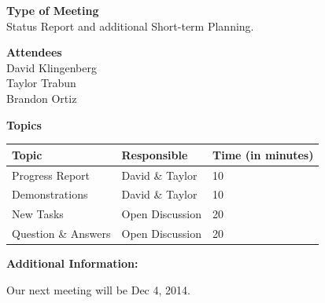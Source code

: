 \documentclass[pdftex,11pt]{article}
\begin{document}
{ \large \bfseries \hspace*{2 mm} Type of Meeting\\}
\hspace*{12 mm}  Status Report and additional Short-term Planning.
\vspace*{1.5mm}

{ \large \bfseries \hspace*{2 mm} Attendees\\}
\hspace*{12mm} David Klingenberg\\
\hspace*{12mm} Taylor Trabun\\
\hspace*{12mm} Brandon Ortiz\\
\vspace*{1.5mm}

{ \large \bfseries \noindent Topics}
\vspace*{2.5mm}

\begin{tabular}{| l | l | l |}
  \hline
  \bfseries Topic & \bfseries Responsible & \bfseries Time (in minutes) \\ \hline
  Progress Report  & David \& Taylor &  10 \\ \hline
  Demonstrations & David \& Taylor & 10 \\ \hline
  New Tasks & Open Discussion & 20 \\ \hline
  Question \&  Answers  & Open Discussion & 20 \\ 
  \hline
\end{tabular}

\vspace*{2.5mm}
{ \large \bfseries \noindent Additional Information:}

Our next meeting will be Dec 4, 2014.
\end{document}

